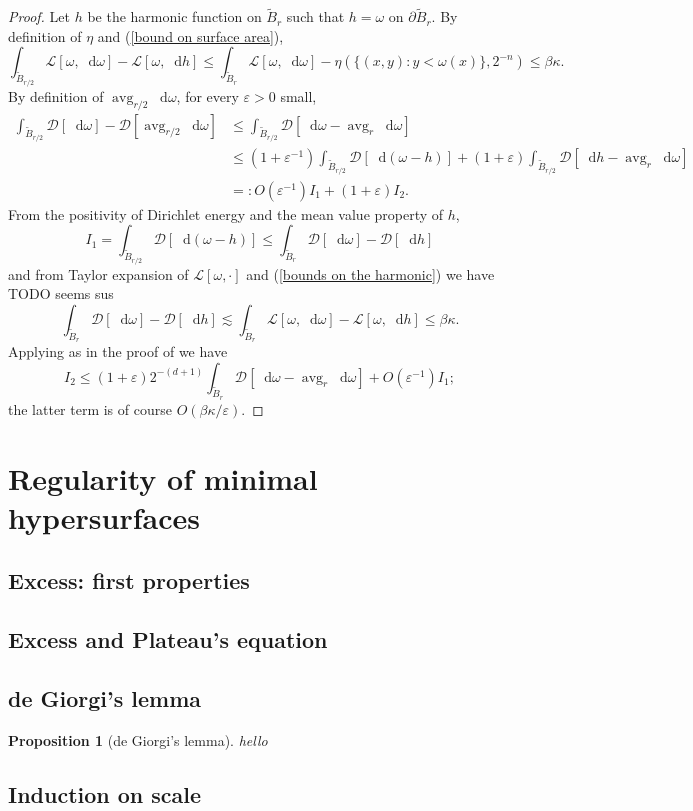 \documentclass[reqno,12pt,letterpaper]{amsart}
\DeclareMathOperator{\avg}{avg}
\newcommand*\dif{\mathop{}\!\mathrm{d}}
\newcommand{\Lagrange}{\mathscr L}
\newcommand{\DirL}{\mathscr D}
\newtheorem{proposition}[theorem]{Proposition}
\theoremstyle{definition}
\numberwithin{equation}{section}
\begin{document}
\begin{proof}
Let $h$ be the harmonic function on $\tilde B_r$ such that $h = \omega$ on $\partial \tilde B_r$.
By definition of $\eta$ and (\ref{bound on surface area}),
\begin{equation}\label{bounds on the harmonic}
\int_{\tilde B_{r/2}} \Lagrange[\omega, \dif \omega] - \Lagrange[\omega, \dif h] \leq \int_{\tilde B_r} \Lagrange[\omega, \dif \omega] - \eta(\{(x, y): y < \omega(x)\}, 2^{-n}) \leq \beta \kappa.
\end{equation}
By definition of $\avg_{r/2} \dif \omega$, for every $\varepsilon > 0$ small,
\begin{align*}
\int_{\tilde B_{r/2}} \DirL[\dif \omega] - \DirL[\avg_{r/2} \dif \omega]
&\leq \int_{\tilde B_{r/2}} \DirL[\dif \omega - \avg_r \dif\omega] \\
&\leq (1 + \varepsilon^{-1}) \int_{\tilde B_{r/2}} \DirL[\dif (\omega - h)] +(1 + \varepsilon) \int_{\tilde B_{r/2}} \DirL[\dif h - \avg_r \dif \omega] \\
&=: O(\varepsilon^{-1}) I_1 + (1 + \varepsilon) I_2.
\end{align*}
From the positivity of Dirichlet energy and the mean value property of $h$,
$$I_1 = \int_{\tilde B_{r/2}} \DirL[\dif (\omega - h)] \leq \int_{\tilde B_r} \DirL[\dif \omega] - \DirL[\dif h]$$
and from Taylor expansion of $\Lagrange[\omega, \cdot]$ and (\ref{bounds on the harmonic}) we have TODO seems sus
$$\int_{\tilde B_r} \DirL[\dif \omega] - \DirL[\dif h] \lesssim \int_{\tilde B_r} \Lagrange[\omega, \dif \omega] - \Lagrange[\omega, \dif h] \leq \beta \kappa.$$
Applying \cite[Lemma 4.1]{Miranda66} as in the proof of \cite[Lemma 4.2]{Miranda66} we have
$$I_2 \leq (1 + \varepsilon) 2^{-(d + 1)} \int_{\tilde B_r} \DirL[\dif \omega - \avg_r \dif \omega] + O(\varepsilon^{-1}) I_1;$$
the latter term is of course $O(\beta \kappa/\varepsilon)$.

\end{proof}


\section{Regularity of minimal hypersurfaces}\label{de Giorgi section}
\subsection{Excess: first properties}
\subsection{Excess and Plateau's equation}
\subsection{de Giorgi's lemma}
\begin{proposition}[de Giorgi's lemma]\label{dGL final}
hello
\end{proposition}
\subsection{Induction on scale}


\printbibliography
\end{document}
